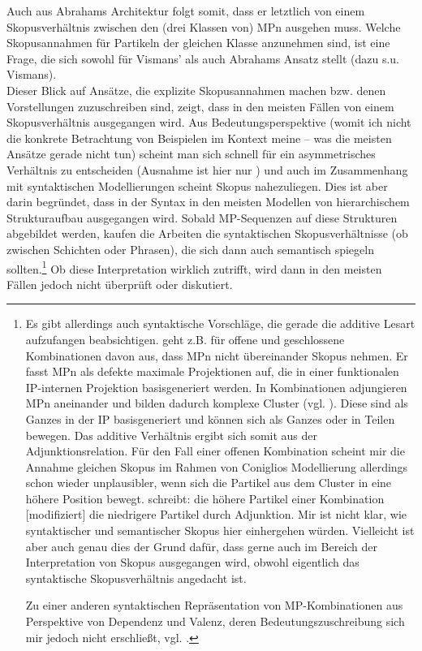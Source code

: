 Auch aus Abrahams Architektur folgt somit, dass er letztlich von einem Skopusverhältnis zwischen den (drei Klassen von) MPn ausgehen muss. Welche Skopusannahmen für Partikeln der gleichen Klasse anzunehmen sind, ist eine Frage, die sich sowohl für Vismans' als auch Abrahams Ansatz stellt (dazu s.u. Vismans).\\

\noindent
Dieser Blick auf Ansätze, die explizite Skopusannahmen machen bzw. denen Vorstellungen zuzuschreiben sind, zeigt, dass in den meisten Fällen von einem Skopusverhältnis ausgegangen wird. Aus Bedeutungsperspektive (womit ich nicht die konkrete Betrachtung von Beispielen im Kontext meine – was die meisten Ansätze gerade nicht tun) scheint man sich schnell für ein asymmetrisches Verhältnis zu entscheiden (Ausnahme ist hier nur \citealt{Thurmair1989}) und auch im Zusammenhang mit syntaktischen Modellierungen scheint Skopus nahezuliegen. Dies ist aber darin begründet, dass in der Syntax in den meisten Modellen von hie\-rarchischem Strukturaufbau ausgegangen wird. Sobald MP-Sequenzen auf diese Strukturen abgebildet werden, \glq kaufen\grq {} die Arbeiten die syntaktischen Skopusverhältnisse (ob zwischen Schichten oder Phrasen), die sich dann auch semantisch spiegeln sollten.\footnote{Es gibt allerdings auch syntaktische Vorschläge, die gerade die additive Lesart aufzufangen beabsichtigen. \citet[98]{Coniglio2011} geht z.B. für offene und geschlossene Kombinationen davon aus, dass MPn nicht übereinander Skopus nehmen. Er fasst MPn als defekte maximale Projektionen auf, die in einer funktionalen IP-internen Projektion basisgeneriert werden. In Kombinationen adjungieren MPn aneinander und bilden dadurch komplexe Cluster (vgl. \citeyear[119]{Coniglio2011}). Diese sind als Ganzes in der IP basisgeneriert und können sich als Ganzes oder in Teilen bewegen. Das additive Verhältnis ergibt sich somit aus der Adjunktions\-relation. Für den Fall einer offenen Kombination scheint mir die Annahme gleichen Skopus im Rahmen von Coniglios Modellierung allerdings schon wieder unplausibler, wenn sich die Partikel aus dem Cluster in eine höhere Position bewegt. \citet[121]{Coniglio2011} schreibt: \glqq die höhere Partikel einer Kombination [modifiziert] die niedrigere Partikel durch Adjunktion\grqq{}. Mir ist nicht klar, wie syntaktischer und semantischer Skopus hier einhergehen würden. Vielleicht ist aber auch genau dies der Grund dafür, dass gerne auch im Bereich der Interpretation von Skopus ausgegangen wird, obwohl eigentlich das syntaktische Skopusverhältnis angedacht ist.

Zu einer anderen syntaktischen Repräsentation von MP-Kombinationen aus Perspektive von Dependenz und Valenz, deren Bedeutungszuschreibung sich mir jedoch nicht erschließt, vgl. \citet[1021]{Eroms2006}.
} 
Ob diese Interpretation wirklich zutrifft, wird dann in den meisten Fällen jedoch nicht überprüft oder diskutiert.\\

